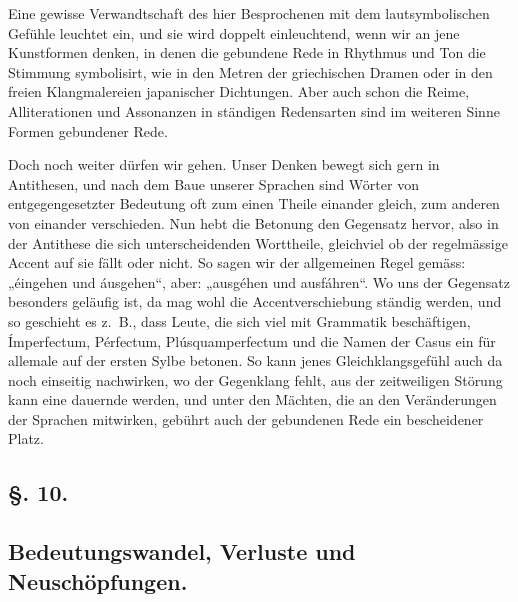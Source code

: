 {Eine gewisse Verwandtschaft des hier Besprochenen mit dem lautsymbolischen Gefühle leuchtet ein, und sie wird doppelt einleuchtend, wenn wir an jene Kunstformen denken, in denen die gebundene Rede in Rhythmus und Ton die Stimmung symbolisirt, wie in den Metren der griechischen Dramen oder in den freien Klangmalereien japanischer Dichtungen. Aber auch schon die Reime, Alliterationen und Assonanzen in ständigen Redensarten sind im weiteren Sinne Formen gebundener Rede.

Doch noch weiter dürfen wir gehen. Unser Denken bewegt sich gern in Antithesen, und nach dem Baue unserer Sprachen sind Wörter von entgegengesetzter Bedeutung oft zum einen Theile einander gleich, zum anderen von einander verschieden. Nun hebt die Betonung den Gegensatz hervor, also in der Antithese die sich unterscheidenden Worttheile, gleichviel ob der regelmässige Accent auf sie fällt oder nicht. So sagen wir der allgemeinen Regel gemäss: „éingehen und áusgehen“, aber: „ausgéhen und ausfáhren“. Wo uns der Gegensatz besonders geläufig ist, da mag wohl die Accentverschiebung ständig werden, und so geschieht es z.~B., dass Leute, die sich viel mit Grammatik beschäftigen, Ímperfectum, Pérfectum, Plúsquamperfectum und die Namen der Casus ein für allemale auf der ersten Sylbe betonen. So kann jenes Gleichklangsgefühl auch da noch einseitig nachwirken, wo der Gegenklang fehlt, aus der zeitweiligen Störung kann eine dauernde werden, und unter den Mächten, die an den Veränderungen der Sprachen mitwirken, gebührt auch der gebundenen Rede ein bescheidener Platz.

\subsection*{§. 10.}\label{III.II.II.10}
\subsection*{Bedeutungswandel, Verluste und Neuschöpfungen.}
}
